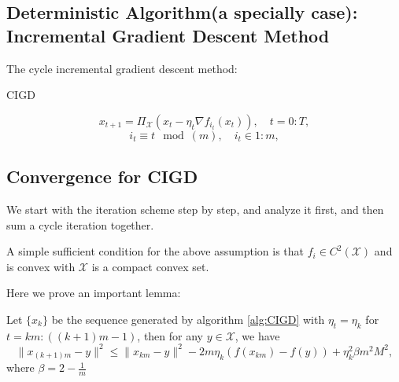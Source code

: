 \subsection{Deterministic Algorithm(a specially case):  Incremental Gradient Descent Method}
The cycle incremental gradient descent method:
\begin{algorithm}\caption{CIGD}
	\label{alg:CIGD}
	\begin{equation}\label{equ:GS-iteration}
	x_{t+1} = \Pi_{\mathcal{X}}(x_{t} - \eta_t \nabla f_{i_t}(x_t)), \quad t = 0:T,
	\end{equation}
	\begin{equation}
	i_t \equiv t \mod(m), \quad i_t \in 1:m,
	\end{equation}
\end{algorithm}


\subsection{Convergence for CIGD}
We start with the iteration scheme step by step, and analyze it first, and then sum a cycle iteration together.

A simple sufficient condition for the above assumption is that $f_i \in C^2(\mathcal{X})$ and is convex with $\mathcal{X}$ is a compact convex set. 

Here we prove an important lemma:
\begin{lemma}\label{lem:CIGDexpand}Let $\{x_k\}$ be the sequence generated by algorithm \ref{alg:CIGD} with $\eta_t = \eta_k$ for $t = km:((k+1)m-1)$, then for any $y \in \mathcal{X}$, we have
	\begin{equation}\label{equ:CIGDexpand}
	\|x_{(k+1)m} - y\|^2 \le \|x_{km} - y\|^2 - 2m\eta_k(f(x_{km}) - f(y)) + \eta_k^2\beta m^2M^2,
	\end{equation}
	where $\beta = 2 - \frac{1}{m}$
\end{lemma}

